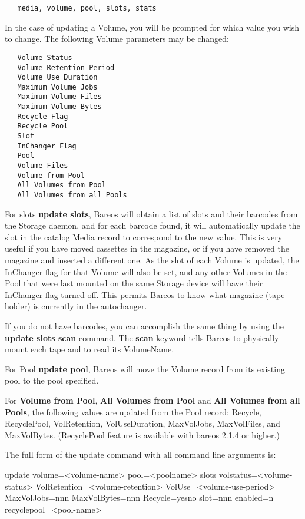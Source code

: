 \begin{description}
{\footnotesize
\begin{verbatim}
   media, volume, pool, slots, stats
\end{verbatim}
\normalsize

In the case of updating a  Volume, you will be prompted for which value you
wish to change.  The following Volume parameters may be changed:

\footnotesize
\begin{verbatim}
   Volume Status
   Volume Retention Period
   Volume Use Duration
   Maximum Volume Jobs
   Maximum Volume Files
   Maximum Volume Bytes
   Recycle Flag
   Recycle Pool
   Slot
   InChanger Flag
   Pool
   Volume Files
   Volume from Pool
   All Volumes from Pool
   All Volumes from all Pools
\end{verbatim}
\normalsize

   For slots {\bf update slots}, Bareos will obtain a list of slots and
   their barcodes from the Storage daemon, and for each barcode found, it
   will automatically update the slot in the catalog Media record to
   correspond to the new value.  This is very useful if you have moved
   cassettes in the magazine, or if you have removed the magazine and
   inserted a different one.  As the slot of each Volume is updated, the
   InChanger flag for that Volume will also be set, and any other Volumes
   in the Pool that were last mounted on the same Storage device
   will have their InChanger flag turned off.  This permits
   Bareos to know what magazine (tape holder) is currently in the
   autochanger.

   If you do not have barcodes, you can accomplish the same thing
   by using the {\bf update slots scan} command.
   The {\bf scan} keyword tells Bareos to physically mount each tape and to
   read its VolumeName.

   For Pool {\bf update pool}, Bareos will move the Volume record from its
   existing pool to the pool specified.

   For {\bf Volume from Pool}, {\bf All Volumes from Pool} and {\bf All Volumes
     from all Pools}, the following values are updated from the Pool record:
   Recycle, RecyclePool, VolRetention, VolUseDuration, MaxVolJobs, MaxVolFiles,
   and MaxVolBytes.  (RecyclePool feature is available with bareos 2.1.4 or
   higher.)

   The full form of the update command with all command line arguments is:

update volume={\textless}volume-name{\textgreater} pool={\textless}poolname{\textgreater}
  slots volstatus={\textless}volume-status{\textgreater} VolRetention={\textless}volume-retention{\textgreater}
  VolUse={\textless}volume-use-period{\textgreater} MaxVolJobs=nnn MaxVolBytes=nnn Recycle=yes{\textbar}no
  slot=nnn enabled=n recyclepool={\textless}pool-name{\textgreater}

}
\end{description}
